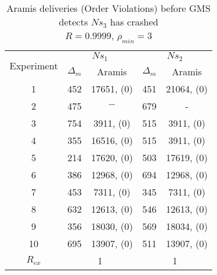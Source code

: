 \begin{table}[p]
    \begin{center}
        \renewcommand{\arraystretch}{1.25}
        \begin{tabular}{|c|c|c|c|c|}
            \hline
            \multirow{2}{*}{Experiment} & \multicolumn{2}{|c|}{$Ns_1$} & \multicolumn{2}{|c|}{$Ns_2$} \\ \cline{2-5}
                                                       & $\Delta_m$&\textsf{Aramis} & $\Delta_m$&\textsf{Aramis} \\ \hline \hline
            1 & 452 & 17651, (0) & 451 & 21064, (0) \\ \hline
            2 & 475 & $-$ & 679 & - \\ \hline
            3 & 754 & 3911, (0) & 515 & 3911, (0)  \\ \hline
            4 & 355 & 16516, (0) & 515 & 3911, (0)  \\ \hline
            5 & 214 & 17620, (0) & 503 & 17619, (0)  \\ \hline
            6 & 386 & 12968, (0) & 694 & 12968, (0)  \\ \hline
            7 & 453 & 7311, (0) & 345 & 7311, (0)  \\ \hline
            8 & 632 & 12613, (0) & 546 & 12613, (0)  \\ \hline
            9 & 356 & 18030, (0) & 569 & 18034, (0)  \\ \hline
            10 & 695 & 13907, (0) & 511 & 13907, (0)  \\ \hline \hline
            $R_{ex}$ & \multicolumn{2}{|c|}{1} & \multicolumn{2}{|c|}{1} \\ \hline

        \end{tabular}
        \caption[\textsf{Aramis} deliveries before GMS detects node crash ($R=0.9999$, $\rho_{min}=3$)]{\textsf{Aramis} deliveries (Order Violations) before GMS detects $Ns_3$ has crashed \\ $R=0.9999$, $\rho_{min}=3$}
        \label{table:crashed_node_rho3}
    \end{center}
\end{table}

